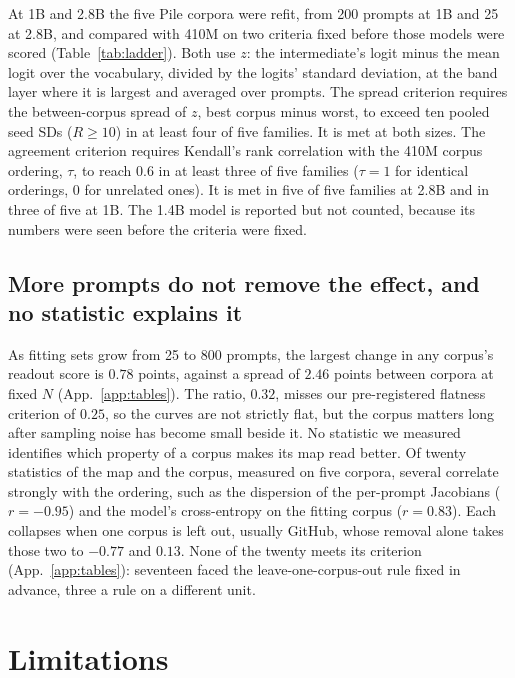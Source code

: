 \documentclass{article}
\begin{document}
At 1B and 2.8B the five Pile corpora were refit, from 200 prompts at 1B and 25 at 2.8B, and compared
with 410M on two criteria fixed before those models were scored (Table~\ref{tab:ladder}). Both use
$z$: the intermediate's logit minus the mean logit over the vocabulary, divided by the logits'
standard deviation, at the band layer where it is largest and averaged over prompts. The spread
criterion requires the between-corpus spread of $z$, best corpus minus worst, to exceed ten pooled
seed SDs ($R\ge10$) in at least four of five families. It is met at both sizes. The agreement
criterion requires Kendall's rank correlation with the 410M corpus ordering, $\tau$, to reach $0.6$
in at least three of five families ($\tau=1$ for identical orderings, $0$ for unrelated ones). It is
met in five of five families at 2.8B and in three of five at 1B. The 1.4B model is reported but not
counted, because its numbers were seen before the criteria were fixed.

\subsection{More prompts do not remove the effect, and no statistic explains it}
\label{sec:unexplained}

As fitting sets grow from 25 to 800 prompts, the largest change in any corpus's readout score is
$0.78$ points, against a spread of $2.46$ points between corpora at fixed $N$ (App.~\ref{app:tables}).
The ratio, $0.32$, misses our pre-registered flatness criterion of $0.25$, so the curves are not
strictly flat, but the corpus matters long after sampling noise has become small beside it. No
statistic we measured identifies which property of a corpus makes its map read better. Of twenty
statistics of the map and the corpus, measured on five corpora, several correlate strongly with the
ordering, such as the dispersion of the per-prompt Jacobians ($r=-0.95$) and the model's
cross-entropy on the fitting corpus ($r=0.83$). Each collapses when one corpus is left out, usually
GitHub, whose removal alone takes those two to $-0.77$ and $0.13$. None of the twenty meets its
criterion (App.~\ref{app:tables}): seventeen faced the leave-one-corpus-out rule fixed in advance,
three a rule on a different unit.

\section{Limitations}
\label{sec:limits}
\end{document}
